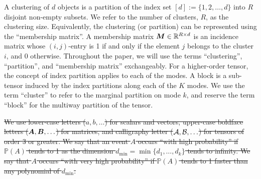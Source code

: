 \documentclass[11pt]{article}
\theoremstyle{plain}
\theoremstyle{definition}
\providecommand{\DIFdeltex}[1]{{\protect\color{red}\sout{#1}}}                      %
\providecommand{\DIFdelbegin}{} %
\providecommand{\DIFdelend}{} %
\providecommand{\DIFdel}[1]{\texorpdfstring{\DIFdeltex{#1}}{}} %
\begin{document}
A clustering of $d$ objects is a partition of the index set $[d]:=\{1,2,\ldots,d\}$ into $R$ disjoint non-empty subsets. We refer to the number of clusters, $R$, as the clustering size. Equivalently, the clustering (or partition) can be represented using the ``membership matrix''. A membership matrix $\bm M\in\mathbb{R}^{R\times d}$ is an incidence matrix whose $(i,j)$-entry is 1 if and only if the element $j$ belongs to the cluster $i$, and 0 otherwise. Throughout the paper, we will use the terms ``clustering'', ``partition'', and ``membership matrix'' exchangeably. For a higher-order tensor, the concept of index partition applies to each of the modes. A block is a sub-tensor induced by the index partitions along each of the $K$ modes. We use the term ``cluster'' to refer to the marginal partition on mode $k$, and reserve the term ``block'' for the multiway partition of the tensor. 

\DIFdelbegin \DIFdel{We use lower-case letters ($a,b,\ldots$) for scalars and vectors, upper-case boldface letters ($\bm A,\bm B,\ldots$) for matrices, and calligraphy letter ($\mathcal{A}, \mathcal{B}, \ldots$) for tensors of order 3 or greater. We say that an event $A$ occurs ``with high probability'' if $\mathbb{P}(A)$ tends to 1 as the dimension $d_{\min}=\min\{d_1,\ldots,d_k\}$ tends to infinity. We say that $A$ occurs ``with very high probability'' if $\mathbb{P}(A)$ tends to 1 faster than any polynomial of $d_{\min}$. 
}\DIFdelend %
\end{document}
